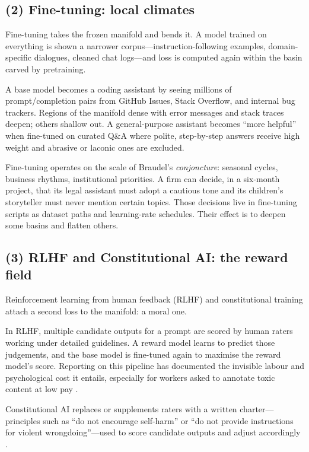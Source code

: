 \documentclass[12pt,a4paper]{article}
\begin{document}
\subsection*{(2) Fine-tuning: local climates}

Fine-tuning takes the frozen manifold and bends it. A model trained on everything is shown a narrower corpus---instruction-following examples, domain-specific dialogues, cleaned chat logs---and loss is computed again within the basin carved by pretraining.

A base model becomes a coding assistant by seeing millions of prompt/completion pairs from GitHub Issues, Stack Overflow, and internal bug trackers. Regions of the manifold dense with error messages and stack traces deepen; others shallow out. A general-purpose assistant becomes ``more helpful'' when fine-tuned on curated Q\&A where polite, step-by-step answers receive high weight and abrasive or laconic ones are excluded.

Fine-tuning operates on the scale of Braudel's \emph{conjoncture}: seasonal cycles, business rhythms, institutional priorities. A firm can decide, in a six-month project, that its legal assistant must adopt a cautious tone and its children's storyteller must never mention certain topics. Those decisions live in fine-tuning scripts as dataset paths and learning-rate schedules. Their effect is to deepen some basins and flatten others.

\subsection*{(3) RLHF and Constitutional AI: the reward field}

Reinforcement learning from human feedback (RLHF) and constitutional training attach a second loss to the manifold: a moral one.

In RLHF, multiple candidate outputs for a prompt are scored by human raters working under detailed guidelines. A reward model learns to predict those judgements, and the base model is fine-tuned again to maximise the reward model's score. Reporting on this pipeline has documented the invisible labour and psychological cost it entails, especially for workers asked to annotate toxic content at low pay \cite{time-rlhf-labor,mtreview-rlhf-labor}.

Constitutional AI replaces or supplements raters with a written charter---principles such as ``do not encourage self-harm'' or ``do not provide instructions for violent wrongdoing''---used to score candidate outputs and adjust accordingly \cite{bai2022constitutional}.
\end{document}

